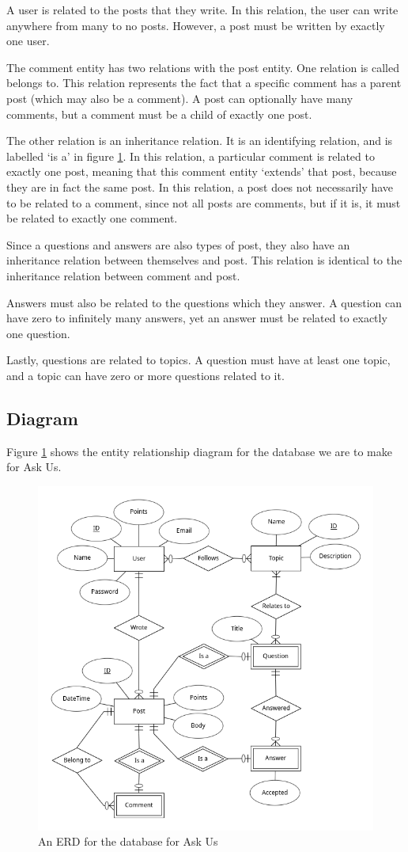 A user is related to the posts that they write. In this relation, the user can write anywhere from many to no posts. However, a post must be written by exactly one user.

The comment entity has two relations with the post entity. One relation is called belongs to. This relation represents the fact that a specific comment has a parent post (which may also be a comment). A post can optionally have many comments, but a comment must be a child of exactly one post.

The other relation is an inheritance relation. It is an identifying relation, and is labelled `is a' in figure \ref{erd}. In this relation, a particular comment is related to exactly one post, meaning that this comment entity `extends' that post, because they are in fact the same post. In this relation, a post does not necessarily have to be related to a comment, since not all posts are comments, but if it is, it must be related to exactly one comment.

Since a questions and answers are also types of post, they also have an inheritance relation between themselves and post. This relation is identical to the inheritance relation between comment and post.

Answers must also be related to the questions which they answer. A question can have zero to infinitely many answers, yet an answer must be related to exactly one question.

Lastly, questions are related to topics. A question must have at least one topic, and a topic can have zero or more questions related to it.

\subsection{Diagram}

Figure \ref{erd} shows the entity relationship diagram for the database we are to make for Ask Us.

\begin{figure}[htb]
	\centering
	\includegraphics[width=\linewidth]{../../ERD/erd.png}
	\caption{An ERD for the database for Ask Us}
	\label{erd}
\end{figure}
